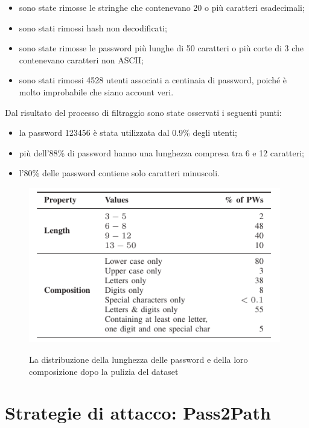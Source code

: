 \begin{itemize}
    \item sono state rimosse le stringhe che contenevano 20 o più caratteri esadecimali;
    \item sono stati rimossi hash non decodificati;
    \item sono state rimosse le password più lunghe di 50 caratteri o più corte di 3 che contenevano caratteri non ASCII;
    \item sono stati rimossi 4528 utenti associati a centinaia di password, poiché è molto improbabile che siano account veri.
\end{itemize}

Dal risultato del processo di filtraggio sono state osservati i seguenti punti:
\begin{itemize}
    \item la password 123456 è stata utilizzata dal 0.9\% degli utenti;
    \item più dell'88\% di password hanno una lunghezza compresa tra 6 e 12 caratteri;
    \item l'80\% delle password contiene solo caratteri minuscoli.
\end{itemize}

\begin{figure}[h]
    \centering
    \includegraphics[width=11cm]{./immagini/pulizia_dataset_biijeta.png}
    \label{pulizia dataset}
    \caption{La distribuzione della lunghezza delle password e della loro composizione dopo la pulizia del dataset~\cite{biijeta}}
\end{figure}



\section{Strategie di attacco: Pass2Path}
